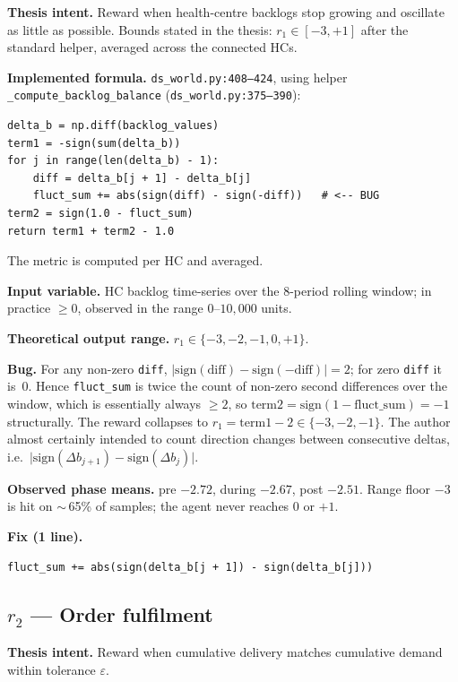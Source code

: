 \documentclass[11pt,letterpaper]{article}
\newcommand{\code}[1]{\texttt{\small #1}}
\begin{document}
\textbf{Thesis intent.}  Reward when health-centre backlogs stop growing and oscillate as little as possible.  Bounds stated in the thesis: $r_1 \in [-3, +1]$ after the standard helper, averaged across the connected HCs.

\textbf{Implemented formula.} \code{ds\_world.py:408--424}, using helper \code{\_compute\_backlog\_balance} (\code{ds\_world.py:375--390}):
\begin{lstlisting}
delta_b = np.diff(backlog_values)
term1 = -sign(sum(delta_b))
for j in range(len(delta_b) - 1):
    diff = delta_b[j + 1] - delta_b[j]
    fluct_sum += abs(sign(diff) - sign(-diff))   # <-- BUG
term2 = sign(1.0 - fluct_sum)
return term1 + term2 - 1.0
\end{lstlisting}
The metric is computed per HC and averaged.

\textbf{Input variable.}  HC backlog time-series over the 8-period rolling window; in practice $\geq 0$, observed in the range $0$--$10{,}000$ units.

\textbf{Theoretical output range.}  $r_1 \in \{-3, -2, -1, 0, +1\}$.

\textbf{Bug.}  For any non-zero \code{diff}, $\lvert \mathrm{sign}(\mathrm{diff}) - \mathrm{sign}(-\mathrm{diff})\rvert = 2$; for zero \code{diff} it is~$0$.  Hence \code{fluct\_sum} is twice the count of non-zero second differences over the window, which is essentially always $\geq 2$, so $\mathrm{term2} = \mathrm{sign}(1 - \mathrm{fluct\_sum}) = -1$ structurally.  The reward collapses to $r_1 = \mathrm{term1} - 2 \in \{-3, -2, -1\}$.  The author almost certainly intended to count direction changes between consecutive deltas, i.e.\ $\lvert \mathrm{sign}(\Delta b_{j+1}) - \mathrm{sign}(\Delta b_j)\rvert$.

\textbf{Observed phase means.}  pre $-2.72$, during $-2.67$, post $-2.51$.  Range floor $-3$ is hit on $\sim$\,65\% of samples; the agent never reaches $0$ or $+1$.

\textbf{Fix (1 line).}
\begin{lstlisting}
fluct_sum += abs(sign(delta_b[j + 1]) - sign(delta_b[j]))
\end{lstlisting}

\subsection{$r_2$ --- Order fulfilment}

\textbf{Thesis intent.}  Reward when cumulative delivery matches cumulative demand within tolerance $\varepsilon$.
\end{document}
